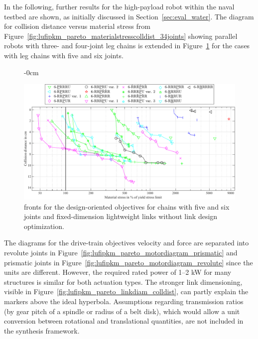 %
%
%
\label{sec:app_lufipkm}

In the following, further results for the high-payload robot within the naval testbed are shown, as initially discussed in Section~\ref{sec:eval_water}.
%
The  diagram for collision distance versus material stress from Figure~\ref{fig:lufipkm_pareto_materialstresscolldist_34joints} showing parallel robots with three- and four-joint leg chains is extended in Figure~\ref{fig:lufipkm_pareto_materialstresscolldist_56joints} for the cases with leg chains with five and six joints.

\vspace{2pt}
\begin{figure}[H]
  \begin{adjustwidth}{-\extralength}{0cm}
    \centering
    \graphicspath{{Figures/}}
    \includegraphics{Figures/lufipkm_pareto_materialstress_colldist_groups_materialstresscolldist_56joints.pdf}
  \end{adjustwidth}
  \caption[Naval-testbed task:  fronts for the design-oriented objectives with fixed-dimension lightweight links without link design optimization]{ fronts for the design-oriented objectives for chains with five and six joints and fixed-dimension lightweight links without link design optimization.}
  \label{fig:lufipkm_pareto_materialstresscolldist_56joints}
\end{figure}

The  diagrams for the drive-train objectives velocity and force are separated into revolute joints in Figure~\ref{fig:lufipkm_pareto_motordiagram_prismatic} and prismatic joints in Figure~\ref{fig:lufipkm_pareto_motordiagram_revolute} since the units are different.
However, the required rated power of 1--2 kW for many structures is similar for both actuation types.
The stronger link dimensioning, visible in Figure~\ref{fig:lufipkm_pareto_linkdiam_colldist}, can partly explain the markers above the ideal hyperbola.
Assumptions regarding transmission ratios (by gear pitch of a spindle or radius of a belt disk), which would allow a unit conversion between rotational and translational quantities, are not included in the synthesis framework.

